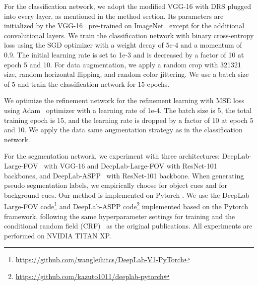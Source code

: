 \documentclass[letterpaper]{article} \usepackage{aaai21}  \usepackage{times}  \usepackage{helvet} \usepackage{courier}  \usepackage[hyphens]{url}  \usepackage{graphicx} \urlstyle{rm} \def\UrlFont{\rm}  \usepackage{natbib}  \usepackage{caption} \frenchspacing  \setlength{\pdfpagewidth}{8.5in}  \setlength{\pdfpageheight}{11in}
\begin{document}
For the classification network, we adopt the modified VGG-16 with DRS plugged into every layer, as mentioned in the method section.
Its parameters are initialized by the VGG-16~\cite{simonyan2014very} pre-trained on ImageNet~\cite{deng2009imagenet} except for the additional convolutional layers.
We train the classification network with binary cross-entropy loss using the SGD optimizer with a weight decay of 5e-4 and a momentum of 0.9. 
The initial learning rate is set to 1e-3 and is decreased by a factor of 10 at epoch 5 and 10. 
For data augmentation, we apply a random crop with 321321 size, random horizontal flipping, and random color jittering.
We use a batch size of 5 and train the classification network for 15 epochs.

We optimize the refinement network for the refinement learning with MSE loss using Adam~\cite{kingma2014adam} optimizer with a learning rate of 1e-4. The batch size is 5, the total training epoch is 15, and the learning rate is dropped by a factor of 10 at epoch 5 and 10.
We apply the data same augmentation strategy as in the classification network.

For the segmentation network, we experiment with three architectures: DeepLab-Large-FOV~\cite{chen2014semantic} with VGG-16 and DeepLab-Large-FOV with ResNet-101~\cite{he2016deep} backbones, and DeepLab-ASPP~\cite{chen2017deeplab} with ResNet-101 backbone.
When generating pseudo segmentation labels, we empirically choose  for object cues and  for background cues.
Our method is implemented on Pytorch \cite{paszke2017automatic}.
We use the DeepLab-Large-FOV code\footnote{\url{https://github.com/wangleihitcs/DeepLab-V1-PyTorch}} and DeepLab-ASPP code\footnote{\url{https://github.com/kazuto1011/deeplab-pytorch}} implemented based on the Pytorch framework, following the same hyperparameter settings for training and the conditional random field (CRF)~\cite{krahenbuhl2011efficient} as the original publications.
All experiments are performed on NVIDIA TITAN XP.


\begin{comment}
\begin{table}[t]
  \centering
  \caption{
    Effect of the two types of controllers and the hyperparameter  for the non-learnable controller.
  }
  \label{tab:controller}
  \begin{adjustbox}{max width=\linewidth}
            \begin{tabular}{c|ccccccc}
            \hline
            \multicolumn{8}{c}{suppression controller} \\
            \hline
            learnable & \multicolumn{7}{c}{non-learnable} \\
                      & =0.90 & =0.80 & =0.70 & =0.60 & =0.55 & =0.50 & =0.40 \\
            \hline
            \textbf{62.9\%} & 51.9\% & 56.0\% & 58.7\% & 62.3\% & \textbf{62.8\%} & 62.3\% & 59.6\% \\
            
            \hline
          \end{tabular}
        \end{adjustbox}
\end{table}
\end{comment}
\end{document}
